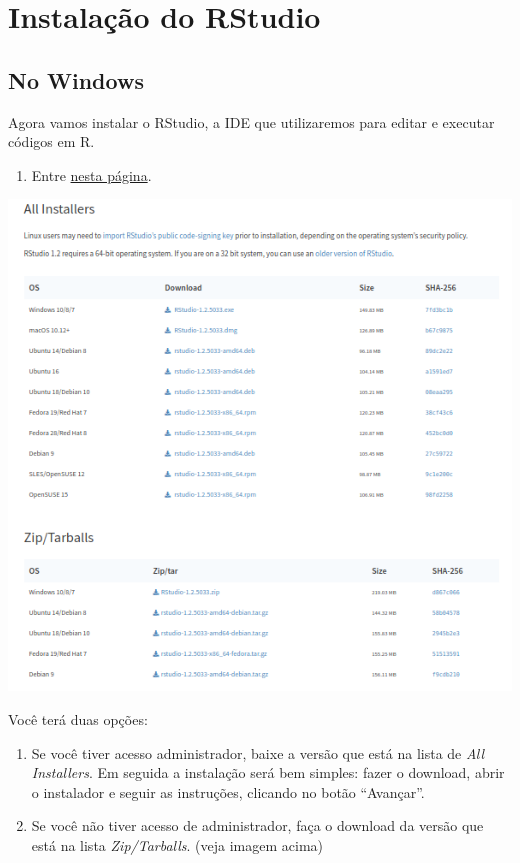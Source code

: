\documentclass[
]{book}
\providecommand{\tightlist}{%
  \setlength{\itemsep}{0pt}\setlength{\parskip}{0pt}}
\begin{document}
\hypertarget{instalauxe7uxe3o-do-rstudio}{%
\section{Instalação do RStudio}\label{instalauxe7uxe3o-do-rstudio}}

\hypertarget{no-windows-1}{%
\subsection{No Windows}\label{no-windows-1}}

Agora vamos instalar o RStudio, a IDE que utilizaremos para editar e executar códigos em R.

\begin{enumerate}
\def\labelenumi{\arabic{enumi}.}
\tightlist
\item
  Entre \href{https://www.rstudio.com/products/rstudio/download/\#download}{nesta página}.
\end{enumerate}

\begin{center}\includegraphics[width=8.18in]{img/instalacao/rstudio-download-opt} \end{center}

Você terá duas opções:

\begin{enumerate}
\def\labelenumi{\alph{enumi})}
\item
  Se você tiver acesso administrador, baixe a versão que está na lista de \emph{All Installers}. Em seguida a instalação
  será bem simples: fazer o download, abrir o instalador e seguir as instruções, clicando no botão ``Avançar''.
\item
  Se você não tiver acesso de administrador, faça o download da versão
  que está na lista \emph{Zip/Tarballs}. (veja imagem acima)
\end{enumerate}
\end{document}
